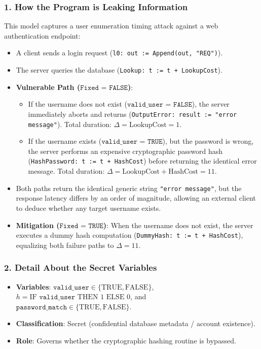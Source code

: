 \documentclass[a4paper,11pt]{article}
\begin{document}
\subsubsection{1. How the Program is Leaking Information}
This model captures a user enumeration timing attack against a web authentication endpoint:
\begin{itemize}
    \item A client sends a login request (\texttt{l0: out := Append(out, "REQ")}).
    \item The server queries the database (\texttt{Lookup: t := t + LookupCost}).
    \item \textbf{Vulnerable Path ($\texttt{Fixed = FALSE}$)}:
    \begin{itemize}
        \item If the username does not exist ($\texttt{valid\_user = FALSE}$), the server immediately aborts and returns (\texttt{OutputError: result := "error message"}). Total duration: $\Delta = \text{LookupCost} = 1$.
        \item If the username exists ($\texttt{valid\_user = TRUE}$), but the password is wrong, the server performs an expensive cryptographic password hash (\texttt{HashPassword: t := t + HashCost}) before returning the identical error message. Total duration: $\Delta = \text{LookupCost} + \text{HashCost} = 11$.
    \end{itemize}
    \item Both paths return the identical generic string \texttt{"error message"}, but the response latency differs by an order of magnitude, allowing an external client to deduce whether any target username exists.
    \item \textbf{Mitigation ($\texttt{Fixed = TRUE}$)}: When the username does not exist, the server executes a dummy hash computation (\texttt{DummyHash: t := t + HashCost}), equalizing both failure paths to $\Delta = 11$.
\end{itemize}

\subsubsection{2. Detail About the Secret Variables}
\begin{itemize}
    \item \textbf{Variables}: $\texttt{valid\_user} \in \{\text{TRUE}, \text{FALSE}\}$, $h = \text{IF } \texttt{valid\_user} \text{ THEN } 1 \text{ ELSE } 0$, and $\texttt{password\_match} \in \{\text{TRUE}, \text{FALSE}\}$.
    \item \textbf{Classification}: Secret (confidential database metadata / account existence).
    \item \textbf{Role}: Governs whether the cryptographic hashing routine is bypassed.
\end{itemize}
\end{document}
